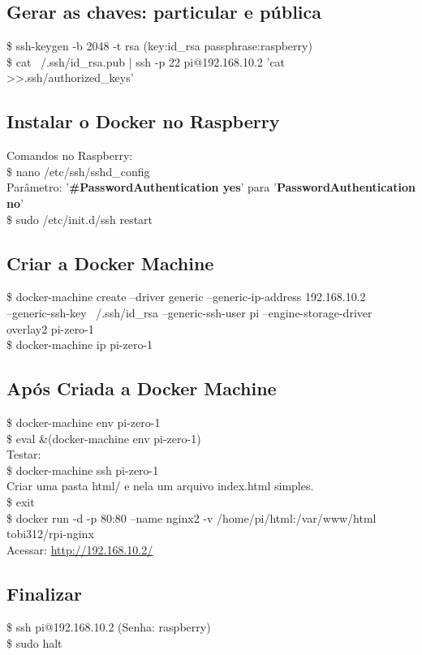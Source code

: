 \documentclass[a4paper,11pt]{article}
\begin{document}
\subsection{Gerar as chaves: particular e pública}
{\ttfamily\$ ssh-keygen -b 2048 -t rsa (key:id\_rsa passphrase:raspberry)} \\
{\ttfamily\$ cat ~/.ssh/id\_rsa.pub | ssh -p 22 pi@192.168.10.2 'cat >>.ssh/authorized\_keys'}

\subsection{Instalar o Docker no Raspberry}
Comandos no Raspberry: \\
{\ttfamily\$ nano /etc/ssh/sshd\_config} \\
Parâmetro: '\textbf{\#PasswordAuthentication yes}' para '\textbf{PasswordAuthentication no}' \\
{\ttfamily\$ sudo /etc/init.d/ssh restart}

\subsection{Criar a Docker Machine}
{\ttfamily\$ docker-machine create --driver generic --generic-ip-address 192.168.10.2 \\ --generic-ssh-key ~/.ssh/id\_rsa --generic-ssh-user pi --engine-storage-driver \\ overlay2 pi-zero-1} \\
{\ttfamily\$ docker-machine ip pi-zero-1}

\subsection{Após Criada a Docker Machine}
{\ttfamily\$ docker-machine env pi-zero-1} \\
{\ttfamily\$ eval \&(docker-machine env pi-zero-1)} \\[2mm]
Testar: \\
{\ttfamily\$ docker-machine ssh pi-zero-1} \\[2mm]
Criar uma pasta html/ e nela um arquivo index.html simples. \\
{\ttfamily\$ exit} \\
{\ttfamily\$ docker run -d -p 80:80 --name nginx2 -v /home/pi/html:/var/www/html tobi312/rpi-nginx} \\
Acessar: \url{http://192.168.10.2/}

\subsection{Finalizar}
{\ttfamily\$ ssh pi@192.168.10.2} (Senha: raspberry) \\
{\ttfamily\$ sudo halt}
\end{document}
